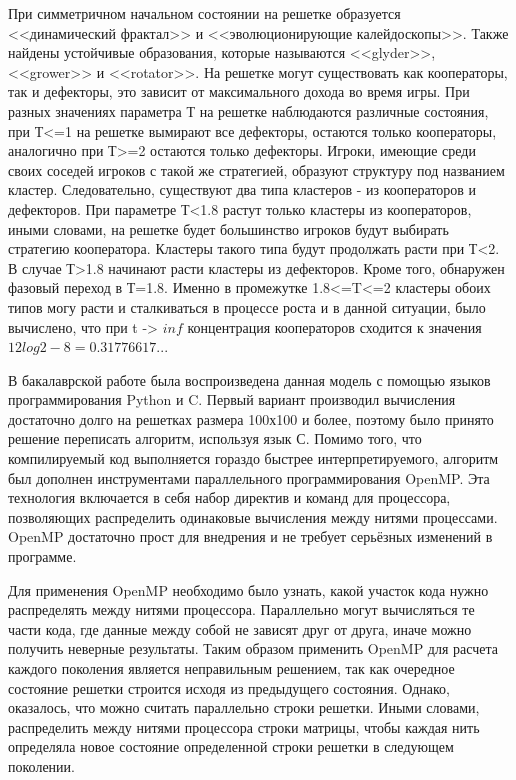 \documentclass[14pt]{article}
\begin{document}
\par При симметричном начальном состоянии на решетке образуется <<динамический фрактал>> и <<эволюционирующие калейдоскопы>>. Также найдены устойчивые образования, которые называются <<glyder>>, <<grower>> и <<rotator>>.  На решетке могут существовать как кооператоры, так и дефекторы, это зависит от максимального дохода во время игры. При разных значениях параметра Т на решетке наблюдаются различные состояния, при Т<=1 на решетке вымирают все дефекторы, остаются только кооператоры, аналогично при Т>=2 остаются только дефекторы. Игроки, имеющие среди своих соседей игроков с такой же стратегией, образуют структуру под названием кластер. Следовательно, существуют два типа кластеров - из кооператоров и дефекторов. При параметре Т<1.8 растут только кластеры из кооператоров, иными словами, на решетке будет большинство игроков будут выбирать стратегию кооператора. Кластеры такого типа будут продолжать расти при Т<2. В случае Т>1.8 начинают расти кластеры из дефекторов. Кроме того, обнаружен фазовый переход в Т=1.8. Именно в промежутке 1.8<=T<=2 кластеры обоих типов могу расти и сталкиваться в процессе роста и в данной ситуации, было вычислено, что при t -> $inf$ концентрация кооператоров сходится к значения $12log2 - 8 = 0.31776617...$
\par В бакалаврской работе\cite{kol} была воспроизведена данная модель с помощью языков программирования Python и C. Первый вариант производил вычисления достаточно долго на решетках размера 100х100 и более, поэтому было принято решение переписать алгоритм, используя язык С. Помимо того, что компилируемый код выполняется гораздо быстрее интерпретируемого, алгоритм был дополнен инструментами параллельного программирования OpenMP. Эта технология включается в себя набор директив и команд для процессора, позволяющих распределить одинаковые вычисления между нитями процессами. OpenMP достаточно прост для внедрения и не требует серьёзных изменений в программе.
\par Для применения OpenMP необходимо было узнать, какой участок кода нужно распределять между нитями процессора. Параллельно могут вычисляться те части кода, где данные между собой не зависят друг от друга, иначе можно получить неверные результаты. Таким образом применить OpenMP для расчета каждого поколения является неправильным решением, так как очередное состояние решетки строится исходя из предыдущего состояния. Однако, оказалось, что можно считать параллельно строки решетки. Иными словами, распределить между нитями процессора строки матрицы, чтобы каждая нить определяла новое состояние определенной строки решетки в следующем поколении.
\end{document}
